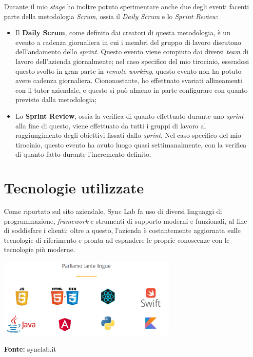 Durante il mio \textit{stage} ho inoltre potuto sperimentare anche due degli eventi facenti parte della metodologia \textit{Scrum}, ossia il \textit{Daily Scrum} e lo \textit{Sprint Review}:
\begin{itemize}
  \item Il \textbf{Daily Scrum}, come definito dai creatori di questa metodologia, è un evento a cadenza giornaliera in cui i membri del gruppo di lavoro discutono dell'andamento dello \textit{sprint}. Questo evento viene compiuto dai diversi \textit{team} di lavoro dell'azienda giornalmente; nel caso specifico del mio tirocinio, essendosi questo svolto in gran parte in \textit{remote working}, questo evento non ha potuto avere cadenza giornaliera. Ciononostante, ho effettuato svariati allineamenti con il tutor aziendale, e questo si può almeno in parte configurare con quanto previsto dalla metodologia;
  \item Lo \textbf{Sprint Review}, ossia la verifica di quanto effettuato durante uno \textit{sprint} alla fine di questo, viene effettuato da tutti i gruppi di lavoro al raggiungimento degli obiettivi fissati dallo \textit{sprint}. Nel caso specifico del mio tirocinio, questo evento ha avuto luogo quasi settimanalmente, con la verifica di quanto fatto durante l'incremento definito.
\end{itemize}


\section{Tecnologie utilizzate}

Come riportato sul sito aziendale, Sync Lab fa uso di diversi linguaggi di programmazione, \textit{framework} e strumenti di supporto moderni e funzionali, al fine di soddisfare i clienti; oltre a questo, l'azienda è costantemente aggiornata sulle tecnologie di riferimento e pronta ad espandere le proprie conoscenze con le tecnologie più moderne. \newpage

\begin{minipage}{\linewidth}
  \centering
    \includegraphics[height=4cm]{immagini/linguaggi}
  \caption*{\textbf{Fonte:} synclab.it}
\end{minipage} \\


